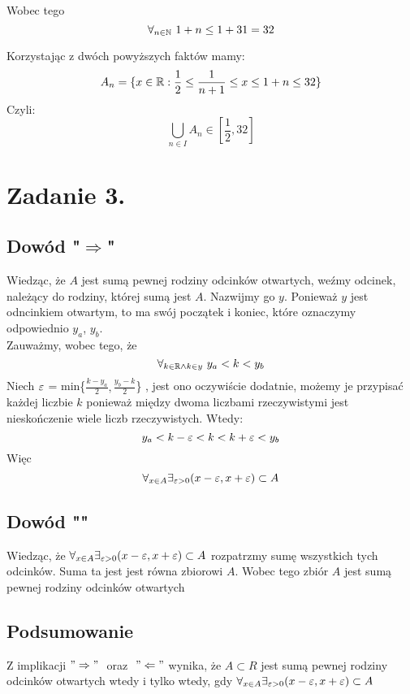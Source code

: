 \documentclass{article}
\begin{document}
Wobec tego \[\forall_{n\in \mathbb{N}} \ 1+n \leq 1+31 = 32 \]

Korzystając z dwóch powyższych faktów mamy:
\[A_n = \{ x\in \mathbb{R} : \frac{1}{2} \leq \frac{1}{n+1} \leq x  \leq 1+n \leq 32\} \]
Czyli:
\[\bigcup_{n\in I}A_n \in [\frac{1}{2},32] \]

\section*{Zadanie 3.}
\subsection*{Dowód "$\Rightarrow$"}

Wiedząc, że $A$ jest sumą pewnej rodziny odcinków otwartych, weźmy odcinek, należący do rodziny, której sumą jest $A$. Nazwijmy go $y$. Ponieważ $y$ jest odncinkiem otwartym, to ma swój początek i koniec, które oznaczymy odpowiednio $y_a$, $y_b$.\\
Zauważmy, wobec tego, że \[\forall_{k\in \mathbb{R}  \wedge k\in y} \ y_a < k < y_b\]
Niech $\varepsilon$ = min\{$\frac{k - y_a}{2}, \frac{y_b - k}{2}$\} , jest ono oczywiście dodatnie, możemy je przypisać każdej liczbie $k$ ponieważ między dwoma liczbami rzeczywistymi jest nieskończenie wiele liczb rzeczywistych.
Wtedy: 
\[y_a < k-\varepsilon < k < k+\varepsilon < y_b\]
Więc \[\forall_{x\in A} \exists_{\varepsilon > 0} (x-\varepsilon,x+\varepsilon) \subset A\]

\subsection*{Dowód "\Leftarrow"}
Wiedząc, że $\forall_{x\in A} \exists_{\varepsilon > 0} (x-\varepsilon,x+\varepsilon) \subset A$ rozpatrzmy sumę wszystkich tych odcinków. Suma ta jest jest równa zbiorowi $A$. Wobec tego zbiór $A$ jest sumą pewnej rodziny odcinków otwartych 

\subsection*{Podsumowanie}
Z implikacji $"\Rightarrow" \ $ oraz $\ "\Leftarrow"$ wynika, że $A \subset R$ jest sumą pewnej rodziny odcinków otwartych wtedy i tylko wtedy, gdy $\forall_{x\in A} \exists_{\varepsilon > 0} (x-\varepsilon,x+\varepsilon) \subset A$

\blacksquare
\end{document}
